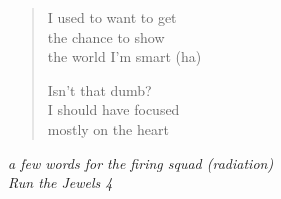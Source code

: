 \clearpage\thispagestyle{empty}\vspace*{\fill}

\begin{verse}
I used to want to get \\
the chance to show \\
the world I'm smart (ha)

Isn't that dumb? \\
I should have focused \\
mostly on the heart
\end{verse}
\begin{flushright}\small\itshape
a few words for the firing squad (radiation) \\
Run the Jewels 4
\end{flushright}

\vspace*{\fill}\clearpage
